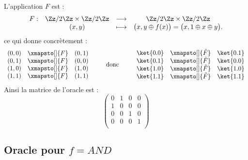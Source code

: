 \documentclass[11pt,class=report,crop=false]{standalone}
\begin{document}
\bigskip

L'application $F$ est : 
$$
\begin{array}{cccc}
F : & \Zz/2\Zz \times \Zz/2\Zz & \longrightarrow & \Zz/2\Zz \times \Zz/2\Zz \\
    & (x,y)                    &\longmapsto      & \big( x , y \oplus f(x) \big) = \big( x , 1 \oplus x \oplus y \big).
\end{array}
$$
ce qui donne concrètement :
$$\begin{array}{rcl}
(0,0) & \xmapsto[]{F}& (0,1) \\
(0,1) & \xmapsto[]{F}& (0,0) \\
(1,0) & \xmapsto[]{F}& (1,0) \\
(1,1) & \xmapsto[]{F}& (1,1) \\
\end{array}
\qquad\text{ donc }\qquad
\begin{array}{rcl}
\ket{0.0} & \xmapsto[]{\tilde F}& \ket{0.1} \\
\ket{0.1} & \xmapsto[]{\tilde F}& \ket{0.0} \\
\ket{1.0} & \xmapsto[]{\tilde F}& \ket{1.0} \\
\ket{1.1} & \xmapsto[]{\tilde F}& \ket{1.1} \\
\end{array}
$$
Ainsi la matrice de l'oracle est :
$$\begin{pmatrix}
0&1&0&0\\
1&0&0&0\\
0&0&1&0\\
0&0&0&1\\
\end{pmatrix}$$


\subsection{Oracle pour $f=AND$}
\end{document}
